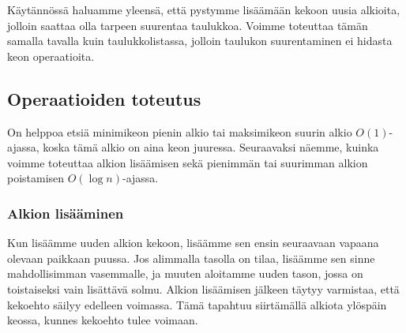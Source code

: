 Käytännössä haluamme yleensä,
että pystymme lisäämään kekoon uusia alkioita,
jolloin saattaa olla tarpeen suurentaa taulukkoa.
Voimme toteuttaa tämän samalla tavalla kuin taulukkolistassa,
jolloin taulukon suurentaminen ei hidasta keon operaatioita.

\subsection{Operaatioiden toteutus}

On helppoa etsiä minimikeon pienin alkio
tai maksimikeon suurin alkio $O(1)$-ajassa,
koska tämä alkio on aina keon juuressa.
Seuraavaksi näemme, kuinka voimme toteuttaa alkion lisäämisen
sekä pienimmän tai suurimman alkion poistamisen $O(\log n)$-ajassa.

\subsubsection{Alkion lisääminen}

Kun lisäämme uuden alkion kekoon, lisäämme sen ensin seuraavaan
vapaana olevaan paikkaan puussa. Jos alimmalla tasolla on tilaa,
lisäämme sen sinne mahdollisimman vasemmalle,
ja muuten aloitamme uuden tason, jossa on toistaiseksi vain lisättävä solmu.
Alkion lisäämisen jälkeen täytyy varmistaa,
että kekoehto säilyy edelleen voimassa.
Tämä tapahtuu siirtämällä alkiota ylöspäin keossa,
kunnes kekoehto tulee voimaan.

